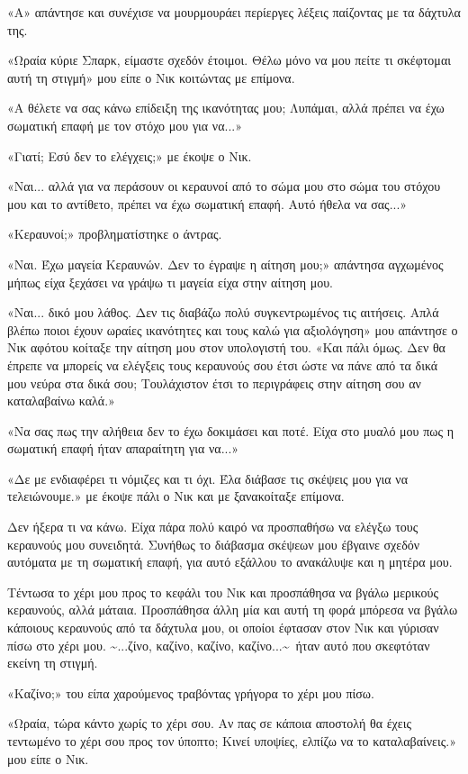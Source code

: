 \documentclass[12pt,twoside, openany]{book}
\begin{document}
«Α» απάντησε και συνέχισε να μουρμουράει περίεργες λέξεις παίζοντας με τα δάχτυλα της.

«Ωραία κύριε Σπαρκ, είμαστε σχεδόν έτοιμοι. Θέλω μόνο να μου πείτε τι σκέφτομαι αυτή τη στιγμή» μου είπε ο Νικ κοιτώντας με επίμονα.

«Α θέλετε να σας κάνω επίδειξη της ικανότητας μου; Λυπάμαι, αλλά πρέπει να έχω σωματική επαφή με τον στόχο μου για να...»

«Γιατί; Εσύ δεν το ελέγχεις;» με έκοψε ο Νικ.

«Ναι... αλλά για να περάσουν οι κεραυνοί από το σώμα μου στο σώμα του στόχου μου και το αντίθετο, πρέπει να έχω σωματική επαφή. Αυτό ήθελα να σας...»

«Κεραυνοί;» προβληματίστηκε ο άντρας.

«Ναι. Έχω μαγεία Κεραυνών. Δεν το έγραψε η αίτηση μου;» απάντησα αγχωμένος μήπως είχα ξεχάσει να γράψω τι μαγεία είχα στην αίτηση μου.

«Ναι... δικό μου λάθος. Δεν τις διαβάζω πολύ συγκεντρωμένος τις αιτήσεις. Απλά βλέπω ποιοι έχουν ωραίες ικανότητες και τους καλώ για αξιολόγηση» μου απάντησε ο Νικ αφότου κοίταξε την αίτηση μου στον υπολογιστή του. «Και πάλι όμως. Δεν θα έπρεπε να μπορείς να ελέγξεις τους κεραυνούς σου έτσι ώστε να πάνε από τα δικά μου νεύρα στα δικά σου; Τουλάχιστον έτσι το περιγράφεις στην αίτηση σου αν καταλαβαίνω καλά.»

«Να σας πως την αλήθεια δεν το έχω δοκιμάσει και ποτέ. Είχα στο μυαλό μου πως η σωματική επαφή ήταν απαραίτητη για να...»

«Δε με ενδιαφέρει τι νόμιζες και τι όχι. Έλα διάβασε τις σκέψεις μου για να τελειώνουμε.» με έκοψε πάλι ο Νικ και με ξανακοίταξε επίμονα.

Δεν ήξερα τι να κάνω. Είχα πάρα πολύ καιρό να προσπαθήσω να ελέγξω τους κεραυνούς μου συνειδητά. Συνήθως το διάβασμα σκέψεων μου έβγαινε σχεδόν αυτόματα με τη σωματική επαφή, για αυτό εξάλλου το ανακάλυψε και η μητέρα μου. 

Τέντωσα το χέρι μου προς το κεφάλι του Νικ και προσπάθησα να βγάλω μερικούς κεραυνούς, αλλά μάταια. Προσπάθησα άλλη μία και αυτή τη φορά μπόρεσα να βγάλω κάποιους κεραυνούς από τα δάχτυλα μου, οι οποίοι έφτασαν στον Νικ και γύρισαν πίσω στο χέρι μου. \textasciitilde ...ζίνο, καζίνο, καζίνο, καζίνο...\textasciitilde\  ήταν αυτό που σκεφτόταν εκείνη τη στιγμή.

«Καζίνο;» του είπα χαρούμενος τραβόντας γρήγορα το χέρι μου πίσω.

«Ωραία, τώρα κάντο χωρίς το χέρι σου. Αν πας σε κάποια αποστολή θα έχεις τεντωμένο το χέρι σου προς τον ύποπτο; Κινεί υποψίες, ελπίζω να το καταλαβαίνεις.» μου είπε ο Νικ.
\end{document}
